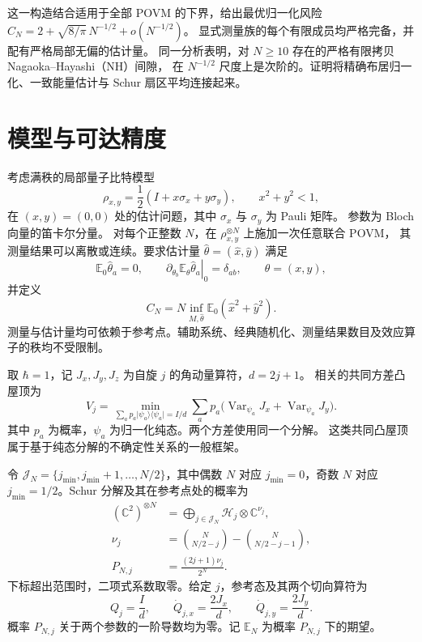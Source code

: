 \documentclass[aps,pra,reprint,superscriptaddress,longbibliography]{revtex4-2}
\theoremstyle{remark}
\DeclareMathOperator{\Var}{Var}
\newcommand{\E}{\mathbb E}
\newcommand{\C}{\mathbb C}
\newcommand{\ket}[1]{\lvert#1\rangle}
\newcommand{\bra}[1]{\langle#1\rvert}
\begin{document}
这一构造结合适用于全部 POVM 的下界，给出最优归一化风险
$C_N=2+\sqrt{8/\pi}\,N^{-1/2}+o(N^{-1/2})$。
显式测量族的每个有限成员均严格完备，并配有严格局部无偏的估计量。
同一分析表明，对 $N\geq10$ 存在的严格有限拷贝 Nagaoka--Hayashi（NH）间隙，
在 $N^{-1/2}$ 尺度上是次阶的。证明将精确布居归一化、一致能量估计与 Schur 扇区平均连接起来。

\section{模型与可达精度}\label{sec:model}\label{sec:reduction}

考虑满秩的局部量子比特模型
\begin{equation}
 \rho_{x,y}=\frac12(I+x\sigma_x+y\sigma_y),\qquad x^2+y^2<1,
 \label{eq:model}
\end{equation}
在 $(x,y)=(0,0)$ 处的估计问题，其中 $\sigma_x$ 与 $\sigma_y$ 为 Pauli 矩阵。
参数为 Bloch 向量的笛卡尔分量。
对每个正整数 $N$，在 $\rho_{x,y}^{\otimes N}$ 上施加一次任意联合 POVM，
其测量结果可以离散或连续。要求估计量 $\widehat\theta=(\widehat x,\widehat y)$ 满足
\begin{equation}
 \E_0\widehat\theta_a=0,\qquad
 \left.\partial_{\theta_b}\E_\theta\widehat\theta_a\right|_0
 =\delta_{ab},\qquad \theta=(x,y),
 \label{eq:unbiased}
\end{equation}
并定义
\begin{equation}
 C_N=N\inf_{M,\widehat\theta}
 \E_0(\widehat x^2+\widehat y^2).
 \label{eq:risk}
\end{equation}
测量与估计量均可依赖于参考点。辅助系统、经典随机化、测量结果数目及效应算子的秩均不受限制。

取 $\hbar=1$，记 $J_x,J_y,J_z$ 为自旋 $j$ 的角动量算符，$d=2j+1$。
相关的共同方差凸屋顶为
\begin{equation}
 V_j=\min_{\sum_a p_a\ket{\psi_a}\bra{\psi_a}=I/d}
 \sum_a p_a\bigl(\Var_{\psi_a}J_x+\Var_{\psi_a}J_y\bigr).
 \label{eq:roof}
\end{equation}
其中 $p_a$ 为概率，$\psi_a$ 为归一化纯态。两个方差使用同一个分解。
这类共同凸屋顶属于基于纯态分解的不确定性关系的一般框架\cite{TothFrowis2022}。

令 $\mathcal J_N=\{j_{\min},j_{\min}+1,\ldots,N/2\}$，其中偶数 $N$ 对应
$j_{\min}=0$，奇数 $N$ 对应 $j_{\min}=1/2$。Schur 分解及其在参考点处的概率为
\begin{equation}
\begin{aligned}
(\C^2)^{\otimes N}
 &=\bigoplus_{j\in\mathcal J_N}\mathcal H_j\otimes\C^{\nu_j},\\
\nu_j&=\binom N{N/2-j}-\binom N{N/2-j-1},\\
P_{N,j}&=\frac{(2j+1)\nu_j}{2^N}.
\end{aligned}
\label{eq:schur}
\end{equation}
下标超出范围时，二项式系数取零。给定 $j$，参考态及其两个切向算符为
\begin{equation}
 Q_j=\frac{I}{d},\qquad \dot Q_{j,x}=\frac{2J_x}{d},\qquad
 \dot Q_{j,y}=\frac{2J_y}{d}.
 \label{eq:tangents}
\end{equation}
概率 $P_{N,j}$ 关于两个参数的一阶导数均为零。记 $\E_N$ 为概率 $P_{N,j}$ 下的期望。
\end{document}

